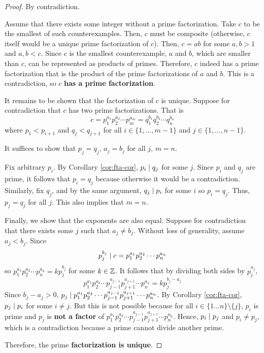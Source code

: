 \begin{proof}
    By contradiction.

    Assume that there exists some integer without a prime factorization. Take $c$ to be the smallest of such counterexamples. Then, $c$ must be composite (otherwise, $c$ itself would be a unique prime factorization of $c$). Then, $c = ab$ for some $a,b > 1$ and $a,b < c$. Since $c$ is the smallest counterexample, $a$ and $b$, which are smaller than $c$, can be represented as products of primes. Therefore, $c$ indeed has a prime factorization that is the product of the prime factorizations of $a$ and $b$. This is a contradiction, so $c$ \textbf{has a prime factorization}.

    It remains to be shown that the factorization of $c$ is unique. Suppose for contradiction that $c$ has two prime factorizations. That is
    $$
    c = p_1^{a_1} p_2^{a_2} \cdots p_m^{a_m} = q_1^{b_1} q_2^{b_2} \cdots q_n^{b_n}
    $$
    where $p_1 < p_{i+1}$ and $q_{j} < q_{j+1}$ for all $i \in \{1,\ldots,m-1\}$ and $j \in \{1,\ldots,n-1\}$.

    It suffices to show that $p_j = q_j$, $a_j = b_j$ for all $j$, $m = n$.
    
    Fix arbitrary $p_i$. By Corollary \ref{cor:fta-cor}, $p_i \mathrel{\mid} q_j$ for some $j$. Since $p_i$ and $q_j$ are prime, it follows that $p_i = q_j$ because otherwise it would be a contradiction. Similarly, fix $q_j$, and by the same argument, $q_j \mathrel{\mid} p_i$ for some $i$ so $p_i = q_j$. Thus, $p_j = q_j$ for all $j$. This also implies that $m = n$.

    Finally, we show that the exponents are also equal. Suppose for contradiction that there exists some $j$ such that $a_j \neq b_j$. Without loss of generality, assume $a_j < b_j$. Since
    $$
    p_j^{b_j} \mathrel{\mid} c = p_1^{a_1} p_2^{a_2} \cdots p_n^{a_n}
    $$
    so $p_1^{a_1} p_2^{a_2} \cdots p_n^{a_n} = k p_j^{b_j}$ for some $k \in \mathbb{Z}$. It follows that by dividing both sides by $p_j^{a_j}$,
    $$
    p_1^{a_1} p_2^{a_2} \cdots p_{j-1}^{a_{j-1}} p_{j+1}^{a_{j+1}} \cdots p_n^{a_n} = k p_{j}^{b_j - a_j}
    $$
    Since $b_j - a_j > 0$, $p_j \mathrel{\mid} p_1^{a_1} p_2^{a_2} \cdots p_{j-1}^{a_{j-1}} p_{j+1}^{a_{j+1}} \cdots p_n^{a_n}$. By Corollary \ref{cor:fta-cor}, $p_j \mathrel{\mid} p_i$ for some $i \neq j$. But this is not possible because for all $i \in \{1\ldots n\} \setminus \{j\}$, $p_i$ is prime and $p_j$ is \textbf{not a factor} of $p_1^{a_1} p_2^{a_2} \cdots p_{j-1}^{a_{j-1}} p_{j+1}^{a_{j+1}} \cdots p_n^{a_n}$. Hence, $p_i \mathrel{\mid} p_j$ and $p_i \neq p_j$, which is a contradiction because a prime cannot divide another prime.

    Therefore, the prime \textbf{factorization is unique}.
\end{proof}